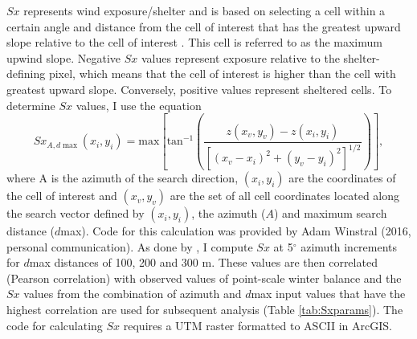 \documentclass{sfuthesis}
\begin{document}
$Sx$ represents wind exposure/shelter and is based on selecting a cell within a certain angle and distance from the cell of interest that has the greatest upward slope relative to the cell of interest \citep{Winstral2002}. This cell is referred to as the maximum upwind slope. Negative $Sx$ values represent exposure relative to the shelter-defining pixel, which means that the cell of interest is higher than the cell with greatest upward slope. Conversely, positive values represent sheltered cells. To determine $Sx$ values, I use the equation
\begin{equation}
Sx_{A, d\max}(x_i, y_i) = \textrm{max} \left[ \textrm{tan}^{-1} \left( \frac{z(x_v,y_v)-z(x_i,y_i)}{[(x_v-x_i)^2+(y_v-y_i)^2]^{1/2}} \right) \right] ,
\end{equation}
where A is the azimuth of the search direction, $(x_i, y_i)$ are the coordinates of the cell of interest and $(x_v, y_v)$ are the set of all cell coordinates located along the search vector defined by	$(x_i, y_i)$, the azimuth ($A$) and maximum search distance ($d$max). Code for this calculation was provided by Adam Winstral (2016, personal communication). As done by \cite{McGrath2015}, I compute $Sx$ at 5$^{\circ}$ azimuth increments for $d$max distances of 100, 200 and 300 m. These values are then correlated (Pearson correlation) with observed values of point-scale winter balance and the $Sx$ values from the combination of azimuth and $d$max input values that have the highest correlation are used for subsequent analysis (Table \ref{tab:Sxparams}). The code for calculating $Sx$ requires a UTM raster formatted to ASCII in ArcGIS. 
\end{document}

